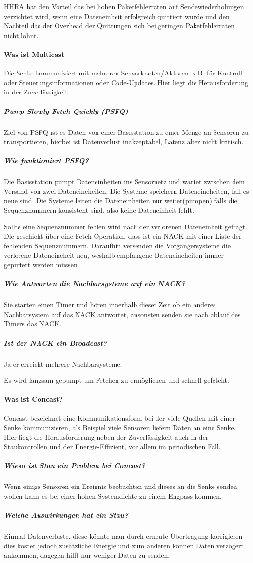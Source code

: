 	HHRA hat den Vorteil das bei hohen Paketfehlerraten auf Sendewiederholungen verzichtet wird, wenn eine Dateneinheit erfolgreich quittiert wurde und den Nachteil das der Overhead der Quittungen sich bei geringen Paketfehlerraten nicht lohnt.
	
	
	
	
	\paragraph{Was ist Multicast}
	Die Senke kommuniziert mit mehreren Sensorknoten/Aktoren. z.B. für Kontroll oder Steuerungsinformationen oder Code-Updates. Hier liegt die Herausforderung in der Zuverlässigkeit.
	
	\subparagraph{Pump Slowly Fetch Quickly (PSFQ)}
	Ziel von PSFQ ist es Daten von einer Basisstation zu einer Menge an Sensoren zu transportieren, hierbei ist Datenverlust inakzeptabel, Latenz aber nicht kritisch.
	\subparagraph{Wie funktioniert PSFQ?}
	Die Basisstation pumpt Dateneinheiten ins Sensornetz und wartet zwischen dem Versand von zwei Dateneineheiten. Die Systeme speichern Dateneineheiten, fall es neue sind. Die Systeme leiten die Dateneinheiten nur weiter(pumpen) falls die Sequenznummern konsistent sind, also keine Dateneinheit fehlt.
	
	Sollte eine Sequenznummer fehlen wird nach der verlorenen Dateneinheit gefragt. Die geschieht über eine Fetch Operation, dass ist ein NACK mit einer Liste der fehlenden Sequenznummern. Daraufhin versenden die Vorgängersysteme die verlorene Dateneineheit neu, weshalb empfangene Dateneineheiten immer gepuffert werden müssen.
	
	\subparagraph{Wie Antworten die Nachbarsysteme auf ein NACK?}
	Sie starten einen Timer und hören innerhalb dieser Zeit ob ein anderes Nachbarsystem auf das NACK antwortet, ansonsten senden sie nach ablauf des Timers das NACK.
	
	\subparagraph{Ist der NACK ein Broadcast?}
	Ja er erreicht mehrere Nachbarsysteme.
	
	Es wird langsam gepumpt um Fetchen zu ermöglichen und schnell gefetcht.
	\paragraph{Was ist Concast?}
	Concast bezeichnet eine Kommunikationsform bei der viele Quellen mit einer Senke kommunizieren, als Beispiel viele Sensoren liefern Daten an eine Senke. Hier liegt die Herausforderung neben der Zuverlässigkeit auch in der Staukontrollen und der Energie-Effizient, vor allem im periodischen Fall.
	\subparagraph{Wieso ist Stau ein Problem bei Concast?}
	Wenn einige Sensoren ein Ereignis beobachten und dieses an die Senke senden wollen kann es bei einer hohen Systemdichte zu einem Engpass kommen.
	\subparagraph{Welche Auswirkungen hat ein Stau?}
	Einmal Datenverluste, diese könnte man durch erneute Übertragung korrigieren dies kostet jedoch zusätzliche Energie und zum anderen können Daten verzögert ankommen, dagegen hilft nur weniger Daten zu senden.
		
